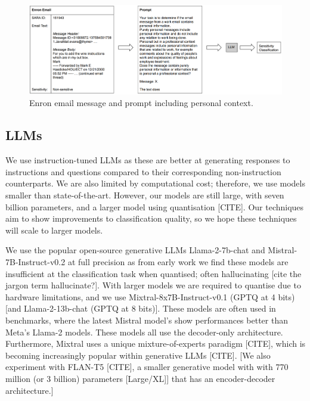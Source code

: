 \begin{figure}
\begin{center}
\includegraphics[scale=0.3]{figures/inputprompt.pdf}
\end{center}
\caption{\label{fig-input}Enron email message and prompt including personal context.}
\end{figure}

\subsection{LLMs}
\label{sec:experiment:LLMs}
We use instruction-tuned LLMs as these are better at generating responses to instructions and questions compared to their corresponding non-instruction counterparts. We are also limited by computational cost; therefore, we use models smaller than state-of-the-art. However, our models are still large, with seven billion parameters, and a larger model using quantisation \cite{}[CITE]. Our techniques aim to show improvements to classification quality, so we hope these techniques will scale to larger models.

We use the popular open-source generative LLMs Llama-2-7b-chat and Mistral-7B-Instruct-v0.2 at full precision as from early work we find these models are insufficient at the classification task when quantised; often hallucinating [cite the jargon term hallucinate?]. With larger models we are required to quantise due to hardware limitations, and we use Mixtral-8x7B-Instruct-v0.1 (GPTQ at 4 bits) [and Llama-2-13b-chat (GPTQ at 8 bits)]. These models are often used in benchmarks, where the latest Mistral model’s show performances better than Meta’s Llama-2 models. These models all use the decoder-only architecture. Furthermore, Mixtral uses a unique mixture-of-experts paradigm \cite{}[CITE], which is becoming increasingly popular within generative LLMs \cite{}[CITE]. [We also experiment with FLAN-T5 \cite{}[CITE], a smaller generative model with with 770 million (or 3 billion) parameters [Large/XL]] that has an encoder-decoder architecture.]

